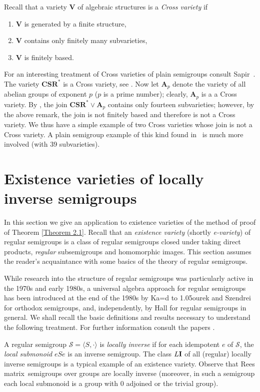 \documentclass[11pt,reqno]{amsart}
\def\softd{{\leavevmode\setbox1=\hbox{d}%
    \hbox to 1.05\wd1{d\kern-0.4ex{\char039}\hss}}}
\numberwithin{equation}{section}
\theoremstyle{remark}
\def\pv#1{{\bf #1}}
\def\Vc{\mathbf{V}}
\def\Rm{Rees matrix}
\begin{document}
Recall that a variety $\Vc$ of algebraic structures is a
\emph{Cross variety} if
\renewcommand{\labelenumi}{\theenumi)}
\begin{enumerate}
\item $\Vc$ is generated by a finite structure,
\item $\Vc$ contains only finitely many subvarieties,
\item $\Vc$ is finitely based.
\end{enumerate}
For an interesting treatment of Cross varieties of plain
semigroups consult Sapir~\cite{S}. The variety $\mathbf{CSR^*}$ is
a Cross variety, see \cite[Theorems 5.1 and 5.2, Corollary
5.4]{A1}. Now let $\mathbf{A}_p$ denote the variety of all abelian
groups of exponent $p$ ($p$ is a prime number); clearly,
$\mathbf{A}_p$ is a a Cross variety. By \cite[Corollaries 5.4 and
6.5]{A1}, the join $\mathbf{CSR^*}\vee\mathbf{A}_p$ contains only
fourteen subvarieties; however, by the above remark, the join is
not finitely based and therefore is not a Cross variety. We thus
have a simple example of two Cross varieties whose join is not a
Cross variety. A plain semigroup example of this kind found
in~\cite[Corollary 2.1]{S} is much more involved (with 39
subvarieties).

\section{Existence varieties of locally inverse semigroups}
In this section we give an application to existence varieties of
the method of proof of Theorem \ref{Theorem 2.1}. Recall that an
\emph{existence variety} (shortly \emph{e-variety}) of regular
semigroups is a class of regular semigroups closed under taking
direct products, \emph{regular} subsemigroups and homomorphic
images. This section assumes the reader's acquaintance with some
basics of the theory of regular semigroups.

While research into the structure of regular semigroups was
particularly active in the 1970s and early 1980s, a universal
algebra approach for regular semigroups has been introduced at the
end of the 1980s by Ka\softd{}ourek and Szendrei \cite{KS} for
orthodox semigroups, and, independently, by Hall \cite{H1,H2} for
regular semigroups in general. We shall recall the basic
definitions and results necessary to understand the following
treatment. For further information consult the papers
\cite{KS,H1,H2,Y1,A2,A3}.

A regular semigroup $\mathcal{S}=\langle S,\cdot\rangle$ is
\emph{locally inverse} if for each idempotent $e$ of $\mathcal S$,
the \emph{local submonoid} $eSe$ is an inverse semigroup. The
class $L\pv I$ of all (regular) locally inverse semigroups is a
typical example of an existence variety. Observe that \Rm\
semigroups over groups are locally inverse (moreover, in such a
semigroup each local submonoid is a group with 0 adjoined or the
trivial group).
\end{document}
